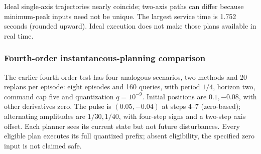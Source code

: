 \documentclass[pdflatex,sn-mathphys-num]{sn-jnl}
\theoremstyle{thmstyleone}
\theoremstyle{thmstyletwo}\newtheorem{remark}[theorem]{Remark}
\begin{document}
Ideal single-axis trajectories nearly coincide; two-axis paths can differ
because minimum-peak inputs need not be unique. The largest service time
is 1.752 seconds (rounded upward). Ideal execution does not make those
plans available in real time.

\subsubsection{Fourth-order instantaneous-planning comparison}\label{sec:four-feedback}
The earlier fourth-order test has four analogous scenarios, two methods and
20 replans per episode: eight episodes and 160 queries, with period $1/4$,
horizon two, command cap five and quantization $q=10^{-9}$.
Initial positions are $0.1,-0.08$, with other derivatives zero.
The pulse is $(0.05,-0.04)$ at steps 4--7 (zero-based); alternating
amplitudes are $1/30,1/40$, with four-step signs and a two-step axis offset.
Each planner sees its current state but not future disturbances.
Every eligible plan executes its full quantized prefix; absent eligibility,
the specified zero input is not claimed safe.
\end{document}
